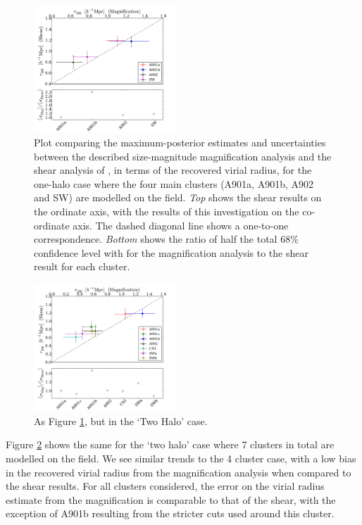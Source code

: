 \documentclass[useAMS,usenatbib,times,letter,amssymb]{mn2e}
\begin{document}
\begin{figure}
\centering
\includegraphics[width = 0.48\textwidth]{Figures/Data/Mass_Reconstruction/Shear_Mag_Comparison_4Cluster.pdf}
\caption{Plot comparing the maximum-posterior estimates and uncertainties between the described size-magnitude magnification analysis and the shear analysis of \cite{Heymans:2008p2060}, in terms of the recovered virial radius, for the one-halo case where the four main clusters (A901a, A901b, A902 and SW) are modelled on the field. {\it Top} shows the shear results on the ordinate axis, with the results of this investigation on the co-ordinate axis. The dashed diagonal line shows a one-to-one correspondence. {\it Bottom} shows the ratio of half the total 68\% confidence level with for the magnification analysis to the shear result for each cluster.} \label{fig:Shear_Mag_Comp_4Cluster}
\end{figure}

\begin{figure}
\centering
\includegraphics[width = 0.48\textwidth]{Figures/Data/Mass_Reconstruction/Shear_Mag_Comparison_7Cluster.pdf}
\caption{As Figure \ref{fig:Shear_Mag_Comp_4Cluster}, but in the `Two Halo' case.} \label{fig:Shear_Mag_Comp_7Cluster}
\end{figure}

Figure \ref{fig:Shear_Mag_Comp_7Cluster} shows the same for the `two halo' case where 7 clusters in total are modelled on the field. We see similar trends to the 4 cluster case, with a low bias in the recovered virial radius from the magnification analysis when compared to the shear results. For all clusters considered, the error on the virial radius estimate from the magnification is comparable to that of the shear, with the exception of A901b resulting from the stricter cuts used around this cluster.
\end{document}
